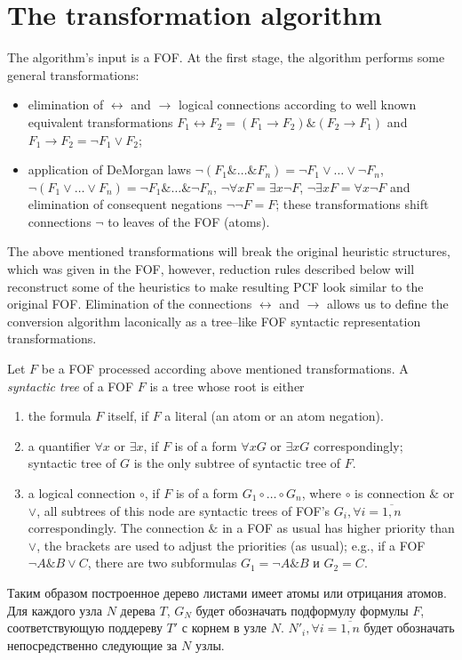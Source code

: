 \documentclass[a4paper,12pt]{article}
\begin{document}
\section{The transformation algorithm}


The algorithm's input is a FOF.  At the first stage, the algorithm performs some general transformations:
\begin{itemize}
\item elimination of $\leftrightarrow$ and $\rightarrow$ logical connections according to well known equivalent transformations $F_1\leftrightarrow F_2 = (F_1\rightarrow F_2)\&(F_2\rightarrow F_1)$ and $F_1\rightarrow F_2 = \neg F_1 \vee F_2$;
\item application of DeMorgan laws $\neg (F_1\&\ldots\& F_n)=\neg F_1\vee\ldots\vee\neg F_n$, $\neg (F_1\vee\ldots\vee F_n)=\neg F_1\&\ldots\&\neg F_n$, $\neg\forall x F = \exists x \neg F$, $\neg\exists x F = \forall x \neg F$ and elimination of consequent negations $\neg\neg F = F$; these transformations shift connections $\neg$ to leaves of the FOF (atoms).
\end{itemize}
The above mentioned transformations will break the original heuristic structures, which was given in the FOF, however, reduction rules described below will reconstruct some of the heuristics to make resulting PCF look similar to the original FOF.  Elimination of the connections $\leftrightarrow$ and $\rightarrow$ allows us to define the conversion algorithm laconically as a tree--like FOF syntactic representation transformations.

Let $F$ be a FOF processed according above mentioned transformations.  A \emph{syntactic tree} of a FOF $F$ is a tree whose root is either
\begin{enumerate}
\item the formula $F$ itself, if $F$ a literal (an atom or an atom negation).
\item a quantifier $\forall x$ or $\exists x$, if $F$ is of a form $\forall x G$ or $\exists x G$ correspondingly; syntactic tree of $G$ is the only subtree of syntactic tree of $F$.
\item a logical connection $\circ$, if $F$ is of a form $G_1\circ\ldots\circ G_n$, where $\circ$ is connection $\&$ or $\vee$, all subtrees of this node are syntactic trees of FOF's $G_i, \forall i=\overline{1,n}$ correspondingly.  The connection $\&$ in a FOF as usual has higher priority than $\vee$, the brackets are used to adjust the priorities (as usual); e.g., if a FOF $\neg A \& B \vee C$, there are two subformulas $G_1 = \neg A\& B$ и $G_2 = C$.
\end{enumerate}
Таким образом построенное дерево листами имеет атомы или отрицания атомов. Для каждого узла $N$ дерева $T$, $G_N$ будет обозначать подформулу формулы $F$, соответствующую поддереву $T'$ с корнем в узле $N$. $N'_i,\forall i=\overline{1,n}$ будет обозначать непосредственно следующие за $N$ узлы.
\end{document}

